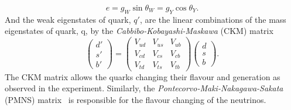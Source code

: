 %
\begin{equation}
    e = g_{W} \sin\theta_{W} = g_{Y} \cos\theta_{Y}.
    \label{eq:sm_coupling_constants}
\end{equation}
%
And the weak eigenstates of quark, $q'$, are the linear combinations of the mass eigenstates of quark, q, by the \textit{Cabbibo-Kobayashi-Maskawa} (CKM) matrix~\cite{Kobayashi:1973fv}
%
\begin{equation}
    \left(\begin{matrix}d'\\s'\\b'\end{matrix}\right) = \left(\begin{matrix}V_{ud} & V_{us} & V_{ub}\\V_{cd} & V_{cs} & V_{cb}\\V_{td} & V_{ts} &V_{tb}\end{matrix}\right) \left(\begin{matrix}d\\s\\b\end{matrix}\right).
    \label{eq:sm_CKM_matrix}
\end{equation}
%
The CKM matrix allows the quarks changing their flavour and generation as observed in the experiment.
Similarly, the \textit{Pontecorvo-Maki-Nakagawa-Sakata} (PMNS) matrix~\cite{Maki:1962mu} is responsible for the flavour changing of the neutrinos.


